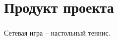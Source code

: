 \section{Продукт проекта}

\begin{frame}
\frametitle{\insertsection} 
\framesubtitle{\insertsubsection}
Сетевая игра -- настольный теннис.
\end{frame}